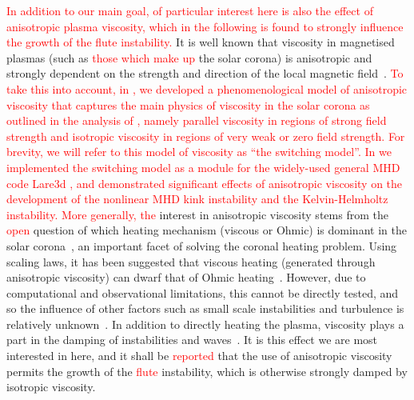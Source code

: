 \documentclass[12pt]{article}
\newcommand{\rs}[2]{\textcolor{red}{#2}}
\begin{document}
\rs{}{In addition to our main goal, of particular interest here is
also the effect of anisotropic plasma viscosity, which in the following is found to
strongly influence the growth of the \rs{fluting}{flute} instability.}
It is well known that viscosity in magnetised plasmas (such as
\rs{that which makes up}{those which make up} the solar corona) is
anisotropic and strongly dependent on the strength and direction of
the local magnetic
field~\cite{hollwegViscosityChewGoldbergerLowEquations1986a,hollwegViscosityMagnetizedPlasma1985,braginskiiTransportProcessesPlasma1965}.
\rs{The development of the switching
model~\cite{mactaggartBraginskiiMagnetohydrodynamicsArbitrary2017}
and implementation in Lare3d has allowed the investigation of
the effect of anisotropic viscosity on solar phenomena.
We find the stability of Lare3d without (the more commonly employed)
isotropic or shock viscosity to be sufficient for at least the study
of kink instabilities in coronal loops~\cite{quinnEffectAnisotropicViscosity2020a}.
}{To take this into account, in \cite{mactaggartBraginskiiMagnetohydrodynamicsArbitrary2017},
we developed a phenomenological model of anisotropic viscosity that
captures the main physics of viscosity in the 
solar corona as outlined in the analysis of
\cite{braginskiiTransportProcessesPlasma1965}, namely parallel
viscosity in regions of strong field  strength and isotropic viscosity
in regions of very weak or zero field strength. For brevity, we will
refer to this model of viscosity as ``the switching model''. In
\cite{quinnEffectAnisotropicViscosity2020a,Quinn2021} we implemented
the switching model as a module for the widely-used general MHD code
Lare3d \cite{arberStaggeredGridLagrangian2001}, and demonstrated
significant effects of anisotropic viscosity on the 
development of the nonlinear MHD kink instability and the
Kelvin-Helmholtz instability.} \rs{The}{More generally, the} interest in
anisotropic viscosity stems from the \rs{unanswered}{open} question of
which heating mechanism (viscous or Ohmic) is dominant in the solar
corona~\cite{klimchukSolvingCoronalHeating2006a}, an important facet
of solving the coronal heating problem. Using scaling laws, it has
been suggested that viscous heating (generated through anisotropic
viscosity) can dwarf that of Ohmic
heating~\cite{craigAnisotropicViscousDissipation2009a,litvinenkoViscousEnergyDissipation2005}.
However,
due to computational and observational limitations, this cannot be
directly tested, and so the influence of other factors such as small
scale instabilities and turbulence is relatively
unknown~\cite{klimchukSolvingCoronalHeating2006a}. In addition to
directly heating the plasma, viscosity plays a part in the damping of
instabilities and waves~\cite{rudermanSlowSurfaceWave2000a}. It is
this effect we are most interested in here, and it shall be \rs{found}{reported} that
the use of anisotropic viscosity permits the growth of the
\rs{fluting}{flute} instability, which is otherwise strongly damped by
isotropic viscosity. 
\end{document}
